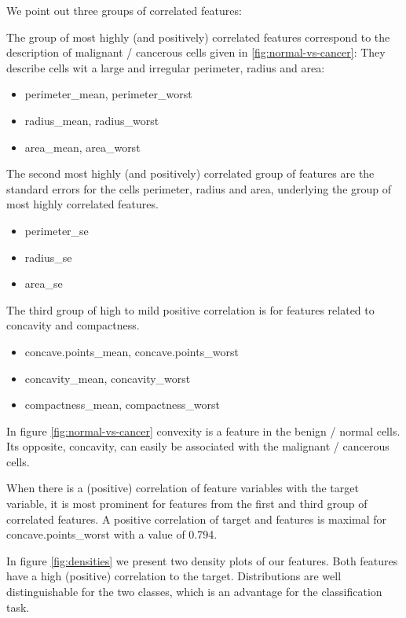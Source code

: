 \documentclass[]{article}
\providecommand{\tightlist}{%
  \setlength{\itemsep}{0pt}\setlength{\parskip}{0pt}}
\begin{document}
We point out three groups of correlated features:

The group of most highly (and positively) correlated features correspond
to the description of malignant / cancerous cells given in
\ref{fig:normal-vs-cancer}: They describe cells wit a large and
irregular perimeter, radius and area:

\begin{itemize}
\tightlist
\item
  perimeter\_mean, perimeter\_worst
\item
  radius\_mean, radius\_worst
\item
  area\_mean, area\_worst
\end{itemize}

The second most highly (and positively) correlated group of features are
the standard errors for the cells perimeter, radius and area, underlying
the group of most highly correlated features.

\begin{itemize}
\tightlist
\item
  perimeter\_se
\item
  radius\_se
\item
  area\_se
\end{itemize}

The third group of high to mild positive correlation is for features
related to concavity and compactness.

\begin{itemize}
\tightlist
\item
  concave.points\_mean, concave.points\_worst
\item
  concavity\_mean, concavity\_worst
\item
  compactness\_mean, compactness\_worst
\end{itemize}

In figure \ref{fig:normal-vs-cancer} convexity is a feature in the
benign / normal cells. Its opposite, concavity, can easily be associated
with the malignant / cancerous cells.

When there is a (positive) correlation of feature variables with the
target variable, it is most prominent for features from the first and
third group of correlated features. A positive correlation of target and
features is maximal for concave.points\_worst with a value of 0.794.

In figure \ref{fig:densities} we present two density plots of our
features. Both features have a high (positive) correlation to the
target. Distributions are well distinguishable for the two classes,
which is an advantage for the classification task.
\end{document}
